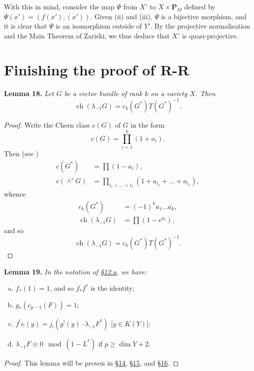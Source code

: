 \documentclass{article}
\newenvironment{itenv}[1]
  {\phantomsection\par\medskip\noindent\textbf{#1.}\itshape}
  {\medskip}
\newcommand{\PP}{\mathbf{P}}
\renewcommand{\geq}{\geqslant}
\DeclareMathOperator{\ch}{ch}
\begin{document}
With this in mind, consider the map $\Psi$ from $X'$ to $X\times\PP_M$ defined by $\Psi(x')=(f(x'),(x'))$.
Given (ii) and (iii), $\Psi$ is a bijective morphism, and it is clear that $\Psi$ is an isomorphism outside of $Y'$.
By the projective normalisation and the Main Theorem of Zariski, we thus deduce that $X'$ is quasi-projective.


\section{Finishing the proof of R-R}
\label{section13}

\begin{itenv}{Lemma 18}
\label{lemma18}
  Let $G$ be a vector bundle of rank $k$ on a variety $X$.
  Then
  \[
    \ch(\lambda_{-1}G) = c_k(G^*)T(G^*)^{-1}.
  \]
\end{itenv}

\begin{proof}
  Write the Chern class $c(G)$ of $G$ in the form
  \[
    c(G) = \prod_{i=1}^k (1+a_i).
  \]
  Then (see \cite{9})
  \begin{align*}
    c(G^*) &= \prod (1-a_i),
  \\c(\wedge^sG) &= \prod_{i_1<\ldots<i_s} (1+a_{i_1}+\ldots+a_{i_s}),
  \end{align*}
  whence
  \begin{align*}
    c_k(G^*) &= (-1)^k a_1\ldots a_k,
  \\\ch(\lambda_{-1}G) &= \prod (1-e^{a_i}),
  \end{align*}
  and so
  \[
    \ch(\lambda_{-1}G) = c_k(G^*)T(G^*)^{-1}.
  \]
\end{proof}

\begin{itenv}{Lemma 19}
\label{lemma19}
  In the notation of \hyperref[section12a]{\S12.a}, we have:
  \begin{enumerate}[(a)]
    \item $f_*(1) = 1$, and so $f_*f^*$ is the identity;
    \item $g_*(c_{p-1}(F)) = 1$;
    \item $f^!i_!(y) = j_!(g^!(y)\cdot\lambda_{-1}F^*)$ [$y\in K(Y)$];
    \item $\lambda_{-1}F\equiv0 \mod(1-L^*)$ if $p\geq\dim Y+2$.
  \end{enumerate}
\end{itenv}

\begin{proof}
  This lemma will be proven in \hyperref[section14]{\S14}, \hyperref[section15]{\S15}, and \hyperref[section16]{\S16}.
\end{proof}
\end{document}
